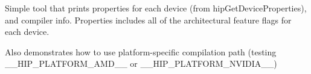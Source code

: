Simple tool that prints properties for each device (from hip\+Get\+Device\+Properties), and compiler info. Properties includes all of the architectural feature flags for each device.

Also demonstrates how to use platform-\/specific compilation path (testing {\ttfamily \+\_\+\+\_\+\+HIP\+\_\+\+PLATFORM\+\_\+\+AMD\+\_\+\+\_\+} or {\ttfamily \+\_\+\+\_\+\+HIP\+\_\+\+PLATFORM\+\_\+\+NVIDIA\+\_\+\+\_\+}) 